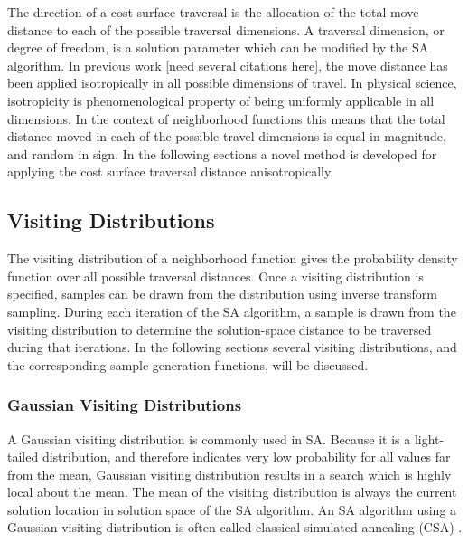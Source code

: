 \documentclass[11pt]{afthesis}
\begin{document}
	The direction of a cost surface traversal is the allocation of the total move distance to each of the possible traversal dimensions. A traversal dimension, or degree of freedom, is a solution parameter which can be modified by the SA algorithm. In previous work [need several citations here]\cite{}, the move distance has been applied isotropically in all possible dimensions of travel. In physical science, isotropicity is phenomenological property of being uniformly applicable in all dimensions. In the context of neighborhood functions this means that the total distance moved in each of the possible travel dimensions is equal in magnitude, and random in sign. In the following sections a novel method is developed for applying the cost surface traversal distance anisotropically. 
	
	
	\subsection{Visiting Distributions}

	
	The visiting distribution of a neighborhood function gives the probability density function over all possible traversal distances. Once a visiting distribution is specified, samples can be drawn from the distribution using inverse transform sampling. During each iteration of the SA algorithm, a sample is drawn from the visiting distribution to determine the solution-space distance to be traversed during that iterations. In the following sections several visiting distributions, and the corresponding sample generation functions, will be discussed.
	
	\label{scn:visiting_distributions}
	
	\subsubsection{Gaussian Visiting Distributions}
	\label{scn:classical_visiting}
	
	A Gaussian visiting distribution is commonly used in SA. Because it is a light-tailed distribution, and therefore indicates very low probability for all values far from the mean, Gaussian visiting distribution results in a search which is highly local about the mean. The mean of the visiting distribution is always the current solution location in solution space of the SA algorithm. An SA algorithm using a Gaussian visiting distribution is often called classical simulated annealing (CSA) \cite{tsallis1996generalizedsimulatedannealing}. 
	
\end{document}
